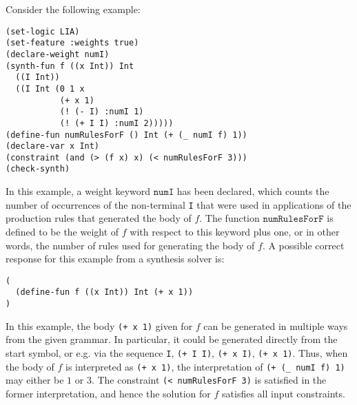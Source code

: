 \documentclass[english,a4paper,10pt]{article}
\begin{document}
\begin{example}
Consider the following example:
\begin{lstlisting}[language=SyGuS]
(set-logic LIA)
(set-feature :weights true)
(declare-weight numI)
(synth-fun f ((x Int)) Int
  ((I Int))
  ((I Int (0 1 x
           (+ x 1)
           (! (- I) :numI 1)
           (! (+ I I) :numI 2)))))
(define-fun numRulesForF () Int (+ (_ numI f) 1))
(declare-var x Int)
(constraint (and (> (f x) x) (< numRulesForF 3)))
(check-synth)
\end{lstlisting}
In this example, a weight keyword $\texttt{numI}$ has been declared,
which counts the number of occurrences of the non-terminal \texttt{I} that
were used in applications of the production rules that generated the body of $f$.
The function $\texttt{numRulesForF}$ is defined to be the weight of $f$ with
respect to this keyword plus one, or in other words, the number of
rules used for generating the body of $f$.
A possible correct response for this example from a synthesis solver is:
\begin{lstlisting}[language=SyGuS]
(
  (define-fun f ((x Int)) Int (+ x 1))
)
\end{lstlisting}
In this example,
the body \texttt{(+ x 1)} given for $f$ can be generated in multiple ways from the given grammar.
In particular, it could be generated directly from the start symbol,
or e.g. via the sequence \texttt{I}, \texttt{(+ I I)}, \texttt{(+ x I)}, \texttt{(+ x 1)}.
Thus, when the body of $f$ is interpreted as \texttt{(+ x 1)},
the interpretation of \texttt{(+ (\_ numI f) 1)} may either be $1$ or $3$.
The constraint \texttt{(< numRulesForF 3)} is satisfied in the former interpretation,
and hence the solution for $f$ satisfies all input constraints.
\end{example}
\end{document}

